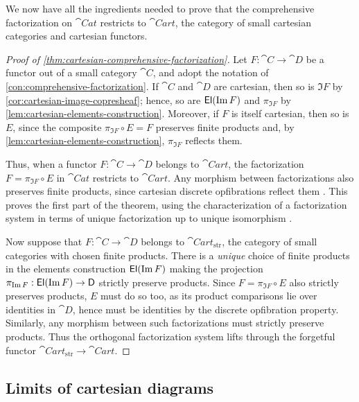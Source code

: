 \documentclass[11pt]{article}
\numberwithin{equation}{section}
\begin{document}
We now have all the ingredients needed to prove that the comprehensive
factorization on $\cat{Cat}$ restricts to $\cat{Cart}$, the category of small
cartesian categories and cartesian functors.

\begin{proof}[Proof of \cref{thm:cartesian-comprehensive-factorization}]
  Let $F: \cat{C} \to \cat{D}$ be a functor out of a small category $\cat{C}$,
  and adopt the notation of \cref{con:comprehensive-factorization}. If $\cat{C}$
  and $\cat{D}$ are cartesian, then so is $\Im F$ by
  \cref{cor:cartesian-image-copresheaf}; hence, so are $\mathop{\mathsf{El}}(\operatorname{Im} F)$ and $\pi_{\Im F}$ by
  \cref{lem:cartesian-elements-construction}. Moreover, if $F$ is itself
  cartesian, then so is $E$, since the composite ${\pi_{\Im F} \circ E = F}$ preserves
  finite products and, by \cref{lem:cartesian-elements-construction}, $\pi_{\Im F}$
  reflects them.

  Thus, when a functor $F: \cat{C} \to \cat{D}$ belongs to $\cat{Cart}$, the
  factorization ${F = \pi_{\Im F} \circ E}$ in $\cat{Cat}$ restricts to $\cat{Cart}$.
  Any morphism between factorizations also preserves finite products, since
  cartesian discrete opfibrations reflect them \cite[\mbox{Lemma
    6.8}]{patterson2023}. This proves the first part of the theorem, using the
  characterization of a factorization system in terms of unique factorization up
  to unique isomorphism \cite[\mbox{Theorem 3.7}]{joyal2020}.

  Now suppose that $F: \cat{C} \to \cat{D}$ belongs to
  $\cat{Cart}_{\mathrm{str}}$, the category of small categories with chosen
  finite products. There is a \emph{unique} choice of finite products in the
  elements construction $\mathop{\mathsf{El}}(\operatorname{Im} F)$ making the projection
  $\pi_{\operatorname{Im} F}: \mathop{\mathsf{El}}(\operatorname{Im} F) \to \mathsf{D}$ strictly preserve products. Since
  $F = \pi_{\Im F} \circ E$ also strictly preserves products, $E$ must do so
  too, as its product comparisons lie over identities in $\cat{D}$, hence must
  be identities by the discrete opfibration property. Similarly, any morphism
  between such factorizations must strictly preserve products. Thus the
  orthogonal factorization system lifts through the forgetful functor
  $\cat{Cart}_{\mathrm{str}} \to \cat{Cart}$.
\end{proof}

\subsection{Limits of cartesian diagrams}
\end{document}
